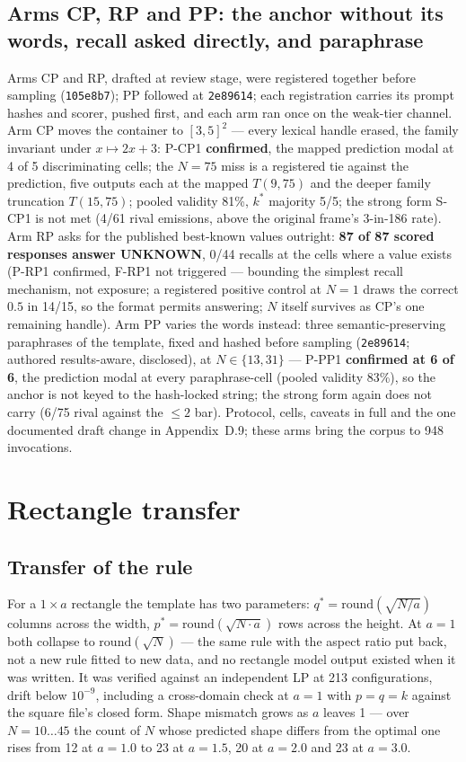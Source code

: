 \subsection{Arms CP, RP and PP: the anchor without its words, recall asked directly, and paraphrase}

Arms CP and RP, drafted at review stage, were registered together before sampling
(\texttt{105e8b7}); PP followed at \texttt{2e89614}; each registration carries its prompt
hashes and scorer, pushed first, and each arm ran once on the weak-tier channel. Arm CP moves the container to $[3,5]^2$ --- every lexical handle
erased, the family invariant under $x \mapsto 2x + 3$: P-CP1 \textbf{confirmed}, the
mapped prediction modal at 4 of 5 discriminating cells; the $N = 75$ miss is a registered
tie against the prediction, five outputs each at the mapped $T(9,75)$ and the deeper
family truncation $T(15,75)$; pooled validity 81\%, $k^*$ majority 5/5; the strong form
S-CP1 is not met (4/61 rival emissions, above the original frame's 3-in-186 rate).
Arm RP asks for the published best-known values outright: \textbf{87 of 87 scored
responses answer UNKNOWN}, 0/44 recalls at the cells where a value exists (P-RP1
confirmed, F-RP1 not triggered --- bounding the simplest recall mechanism, not exposure;
a registered positive control at $N = 1$ draws the correct $0.5$ in 14/15, so the format
permits answering; $N$ itself survives as CP's one
remaining handle). Arm PP varies the words instead: three semantic-preserving paraphrases
of the template, fixed and hashed before sampling (\texttt{2e89614}; authored results-aware,
disclosed), at $N \in \{13, 31\}$ --- P-PP1 \textbf{confirmed at 6 of 6}, the prediction modal at
every paraphrase-cell (pooled validity 83\%), so the anchor is not keyed to the hash-locked
string; the strong form again does not carry (6/75 rival against the $\le 2$ bar).
Protocol, cells, caveats in full and
the one documented draft change in Appendix~D.9; these arms bring the corpus to 948 invocations.

\section{Rectangle transfer}

\subsection{Transfer of the rule}

For a $1 \times a$ rectangle the template has two parameters: $q^* = \mathrm{round}(\sqrt{N/a})$
columns across the width, $p^* = \mathrm{round}(\sqrt{N \cdot a})$ rows across the height. At $a = 1$
both collapse to $\mathrm{round}(\sqrt{N})$ --- the same rule with the aspect ratio put back, not a
new rule fitted to new data, and no rectangle model output existed when it was written. It was
verified against an independent LP at 213 configurations, drift below $10^{-9}$, including a
cross-domain check at $a = 1$ with $p = q = k$ against the square file's closed form. Shape
mismatch grows as $a$ leaves 1 --- over $N = 10\ldots45$ the count of $N$ whose predicted shape
differs from the optimal one rises from 12 at $a = 1.0$ to 23 at $a = 1.5$, 20 at $a = 2.0$ and 23
at $a = 3.0$.


